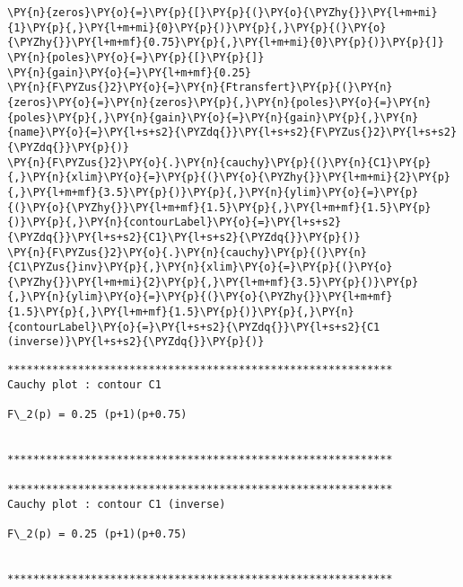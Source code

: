     \begin{tcolorbox}[breakable, size=fbox, boxrule=1pt, pad at break*=1mm,colback=cellbackground, colframe=cellborder]
\begin{Verbatim}[commandchars=\\\{\}]
\PY{n}{zeros}\PY{o}{=}\PY{p}{[}\PY{p}{(}\PY{o}{\PYZhy{}}\PY{l+m+mi}{1}\PY{p}{,}\PY{l+m+mi}{0}\PY{p}{)}\PY{p}{,}\PY{p}{(}\PY{o}{\PYZhy{}}\PY{l+m+mf}{0.75}\PY{p}{,}\PY{l+m+mi}{0}\PY{p}{)}\PY{p}{]}
\PY{n}{poles}\PY{o}{=}\PY{p}{[}\PY{p}{]}
\PY{n}{gain}\PY{o}{=}\PY{l+m+mf}{0.25}
\PY{n}{F\PYZus{}2}\PY{o}{=}\PY{n}{Ftransfert}\PY{p}{(}\PY{n}{zeros}\PY{o}{=}\PY{n}{zeros}\PY{p}{,}\PY{n}{poles}\PY{o}{=}\PY{n}{poles}\PY{p}{,}\PY{n}{gain}\PY{o}{=}\PY{n}{gain}\PY{p}{,}\PY{n}{name}\PY{o}{=}\PY{l+s+s2}{\PYZdq{}}\PY{l+s+s2}{F\PYZus{}2}\PY{l+s+s2}{\PYZdq{}}\PY{p}{)}
\PY{n}{F\PYZus{}2}\PY{o}{.}\PY{n}{cauchy}\PY{p}{(}\PY{n}{C1}\PY{p}{,}\PY{n}{xlim}\PY{o}{=}\PY{p}{(}\PY{o}{\PYZhy{}}\PY{l+m+mi}{2}\PY{p}{,}\PY{l+m+mf}{3.5}\PY{p}{)}\PY{p}{,}\PY{n}{ylim}\PY{o}{=}\PY{p}{(}\PY{o}{\PYZhy{}}\PY{l+m+mf}{1.5}\PY{p}{,}\PY{l+m+mf}{1.5}\PY{p}{)}\PY{p}{,}\PY{n}{contourLabel}\PY{o}{=}\PY{l+s+s2}{\PYZdq{}}\PY{l+s+s2}{C1}\PY{l+s+s2}{\PYZdq{}}\PY{p}{)}
\PY{n}{F\PYZus{}2}\PY{o}{.}\PY{n}{cauchy}\PY{p}{(}\PY{n}{C1\PYZus{}inv}\PY{p}{,}\PY{n}{xlim}\PY{o}{=}\PY{p}{(}\PY{o}{\PYZhy{}}\PY{l+m+mi}{2}\PY{p}{,}\PY{l+m+mf}{3.5}\PY{p}{)}\PY{p}{,}\PY{n}{ylim}\PY{o}{=}\PY{p}{(}\PY{o}{\PYZhy{}}\PY{l+m+mf}{1.5}\PY{p}{,}\PY{l+m+mf}{1.5}\PY{p}{)}\PY{p}{,}\PY{n}{contourLabel}\PY{o}{=}\PY{l+s+s2}{\PYZdq{}}\PY{l+s+s2}{C1 (inverse)}\PY{l+s+s2}{\PYZdq{}}\PY{p}{)}
\end{Verbatim}
\end{tcolorbox}

    \begin{Verbatim}[commandchars=\\\{\}]
************************************************************
Cauchy plot : contour C1

F\_2(p) = 0.25 (p+1)(p+0.75)


************************************************************

************************************************************
Cauchy plot : contour C1 (inverse)

F\_2(p) = 0.25 (p+1)(p+0.75)


************************************************************

    \end{Verbatim}

